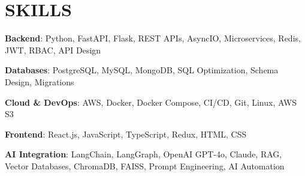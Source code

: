 \documentclass[letterpaper,11pt]{article}
\begin{document}
\section{SKILLS}

\begin{itemize}[leftmargin=0in, label={}]
\small{\item{

\textbf{Backend}: Python, FastAPI, Flask, REST APIs, AsyncIO, Microservices, Redis, JWT, RBAC, API Design

\vspace{2pt}

\textbf{Databases}: PostgreSQL, MySQL, MongoDB, SQL Optimization, Schema Design, Migrations

\vspace{2pt}

\textbf{Cloud \& DevOps}: AWS, Docker, Docker Compose, CI/CD, Git, Linux, AWS S3

\vspace{2pt}

\textbf{Frontend}: React.js, JavaScript, TypeScript, Redux, HTML, CSS

\vspace{2pt}

\textbf{AI Integration}: LangChain, LangGraph, OpenAI GPT-4o, Claude, RAG, Vector Databases, ChromaDB, FAISS, Prompt Engineering, AI Automation

}}
\end{itemize}


\end{document}
